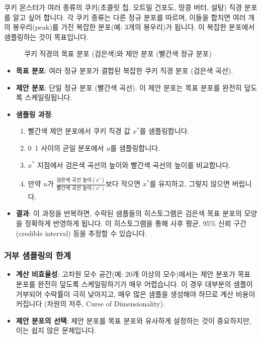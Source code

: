 \documentclass[11pt,a4paper]{book}
\theoremstyle{definition}
\begin{document}
\begin{examplebox}[title=쿠키 몬스터 예시: 다봉형 분포 샘플링]
쿠키 몬스터가 여러 종류의 쿠키(초콜릿 칩, 오트밀 건포도, 땅콩 버터, 설탕) 직경 분포를 알고 싶어 합니다. 각 쿠키 종류는 다른 정규 분포를 따르며, 이들을 합치면 여러 개의 봉우리(peak)를 가진 복잡한 분포(예: 3개의 봉우리)가 됩니다. 이 복잡한 분포에서 샘플링하는 것이 목표입니다.

\begin{figure}[h!]
    \centering
    \caption{쿠키 직경의 목표 분포 (검은색)와 제안 분포 (빨간색 정규 분포)}
    \label{fig:cookie_monster_pdf}
\end{figure}

\begin{itemize}
    \item \textbf{목표 분포}: 여러 정규 분포가 결합된 복잡한 쿠키 직경 분포 (검은색 곡선).
    \item \textbf{제안 분포}: 단일 정규 분포 (빨간색 곡선). 이 제안 분포는 목표 분포를 완전히 덮도록 스케일링됩니다.
    \item \textbf{샘플링 과정}:
    \begin{enumerate}
        \item 빨간색 제안 분포에서 쿠키 직경 값 $x^*$를 샘플링합니다.
        \item 0~1 사이의 균일 분포에서 $u$를 샘플링합니다.
        \item $x^*$ 지점에서 검은색 곡선의 높이와 빨간색 곡선의 높이를 비교합니다.
        \item 만약 $u$가 $\frac{\text{검은색 곡선 높이}(x^*)}{\text{빨간색 곡선 높이}(x^*)}$보다 작으면 $x^*$를 유지하고, 그렇지 않으면 버립니다.
    \end{enumerate}
    \item \textbf{결과}: 이 과정을 반복하면, 수락된 샘플들의 히스토그램은 검은색 목표 분포의 모양을 정확하게 반영하게 됩니다. 이 히스토그램을 통해 사후 평균, 95\% 신뢰 구간(credible interval) 등을 추정할 수 있습니다.
\end{itemize}
\end{examplebox}

\subsubsection*{거부 샘플링의 한계}
\begin{itemize}
    \item \textbf{계산 비효율성}: 고차원 모수 공간(예: 20개 이상의 모수)에서는 제안 분포가 목표 분포를 완전히 덮도록 스케일링하기가 매우 어렵습니다. 이 경우 대부분의 샘플이 거부되어 수락률이 극히 낮아지고, 매우 많은 샘플을 생성해야 하므로 계산 비용이 커집니다 (차원의 저주, Curse of Dimensionality).
    \item \textbf{제안 분포의 선택}: 제안 분포를 목표 분포와 유사하게 설정하는 것이 중요하지만, 이는 쉽지 않은 문제입니다.
\end{itemize}
\end{document}
